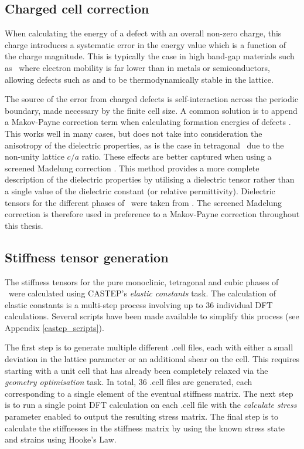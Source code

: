 \subsection{Charged cell correction}

When calculating the energy of a defect with an overall non-zero charge, this charge introduces a systematic error in the energy value which is a function of the charge magnitude. This is typically the case in high band-gap materials such as \zirconia\ where electron mobility is far lower than in metals or semiconductors, allowing defects such as  and  to be thermodynamically stable in the lattice. 

The source of the error from charged defects is self-interaction across the periodic boundary, made necessary by the finite cell size. A common solution is to append a Makov-Payne correction term when calculating formation energies of defects \cite{Makov1995, Makov1996}. This works well in many cases, but does not take into consideration the anisotropy of the dielectric properties, as is the case in tetragonal \zirconia\ due to the non-unity lattice $c/a$ ratio. These effects are better captured when using a screened Madelung correction \cite{Murphy2013}. This method provides a more complete description of the dielectric properties by utilising a dielectric tensor rather than a single value of the dielectric constant (or relative permittivity). Dielectric tensors for the different phases of \zirconia\ were taken from \cite{Zhao2002a, Zhao2002}. The screened Madelung correction is therefore used in preference to a Makov-Payne correction throughout this thesis.

\subsection{Stiffness tensor generation}

The stiffness tensors for the pure monoclinic, tetragonal and cubic phases of \zirconia\ were calculated using CASTEP's \emph{elastic constants} task. The calculation of elastic constants is a multi-step process involving up to 36 individual DFT calculations. Several scripts have been made available to simplify this process (see Appendix \ref{castep_scripts}).

The first step is to generate multiple different .cell files, each with either a small deviation in the lattice parameter or an additional shear on the cell. This requires starting with a unit cell that has already been completely relaxed via the \emph{geometry optimisation} task. In total, 36 .cell files are generated, each corresponding to a single element of the eventual stiffness matrix. The next step is to run a single point DFT calculation on each .cell file with the \emph{calculate stress} parameter enabled to output the resulting stress matrix. The final step is to calculate the stiffnesses in the stiffness matrix by using the known stress state and strains using Hooke's Law. 

